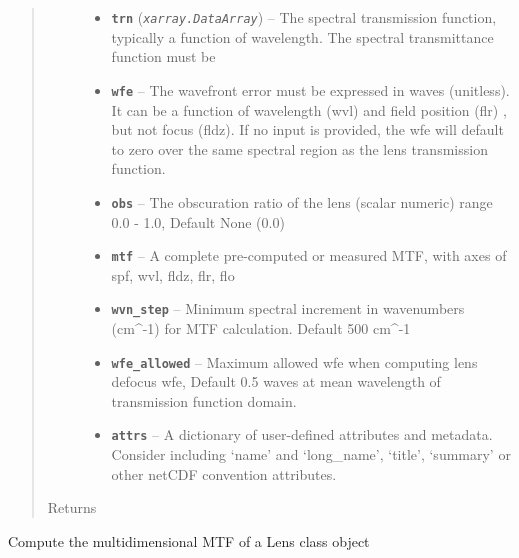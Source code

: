 \documentclass[a4paper,10pt,english]{sphinxmanual}
\begin{document}
\begin{fulllineitems}
\begin{fulllineitems}
\begin{quote}
\begin{description}
\begin{itemize}
\item {} 
\textbf{\texttt{trn}} (\emph{\texttt{xarray.DataArray}}) -- The spectral transmission function, typically a function of wavelength. The spectral
transmittance function must be

\item {} 
\textbf{\texttt{wfe}} -- The wavefront error must be expressed in waves (unitless). It can be a function of
wavelength (wvl) and field position (flr) , but not focus (fldz). If no input is provided, the wfe
will default to zero over the same spectral region as the lens transmission function.

\item {} 
\textbf{\texttt{obs}} -- The obscuration ratio of the lens (scalar numeric) range 0.0 - 1.0, Default None (0.0)

\item {} 
\textbf{\texttt{mtf}} -- A complete pre-computed or measured MTF, with axes of spf, wvl, fldz, flr, flo

\item {} 
\textbf{\texttt{wvn\_step}} -- Minimum spectral increment in wavenumbers (cm\textasciicircum{}-1) for MTF calculation. Default 500 cm\textasciicircum{}-1

\item {} 
\textbf{\texttt{wfe\_allowed}} -- Maximum allowed wfe when computing lens defocus wfe, Default 0.5 waves at mean wavelength
of transmission function domain.

\item {} 
\textbf{\texttt{attrs}} -- A dictionary of user-defined attributes and metadata. Consider including `name' and
`long\_name', `title', `summary' or other netCDF convention attributes.

\end{itemize}

\item[{Returns}] \leavevmode


\end{description}\end{quote}

\end{fulllineitems}


\begin{fulllineitems}
\label{packages:optics.Lens.mtf_obs_wfe}
Compute the multidimensional MTF of a Lens class object



\end{fulllineitems}
\end{fulllineitems}
\end{document}

